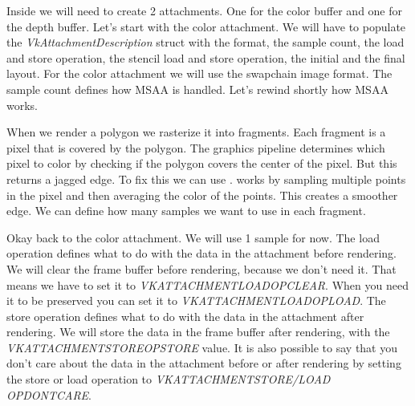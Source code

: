 \documentclass[12pt]{report} \usepackage{preamble}
\begin{document}
Inside we will need to create 2 attachments. One for the color buffer and one for the depth buffer.
Let's start with the color attachment. We will have to populate the \textit{VkAttachmentDescription} struct
with the format, the sample count, the load and store operation, the stencil load and store operation, the initial
and the final layout. For the color attachment we will use the swapchain image format. The sample count defines how
\ac{MSAA} is handled. Let's rewind shortly how \ac{MSAA} works.

When we render a polygon we rasterize it into fragments. Each fragment is a pixel that is covered by the polygon.
The graphics pipeline determines which pixel to color by checking if the polygon covers the center of the pixel.
But this returns a jagged edge. To fix this we can use .  works by sampling multiple points in the pixel
and then averaging the color of the points. This creates a smoother edge. We can define how many samples we want to use
in each fragment.

Okay back to the color attachment. We will use 1 sample for now. The load operation defines what to do with the data
in the attachment before rendering. We will clear the frame buffer before rendering, because we don't need it.
That means we have to set it to \textit{VK\textunderscore ATTACHMENT\textunderscore LOAD\textunderscore OP\textunderscore CLEAR}.
When you need it to be preserved you can set it to
\textit{VK\textunderscore ATTACHMENT\textunderscore LOAD\textunderscore OP\textunderscore LOAD}. The store
operation defines what to do with the data in the attachment after rendering. We will store the data in the frame buffer
after rendering, with the \textit{VK\textunderscore ATTACHMENT\textunderscore STORE\textunderscore OP\textunderscore STORE}
value. It is also possible to say that you don't care about the data in the attachment before or after rendering
by setting the store or load operation to
\textit{VK\textunderscore ATTACHMENT\textunderscore STORE/LOAD \textunderscore OP\textunderscore DONT\textunderscore CARE}.
\end{document}
